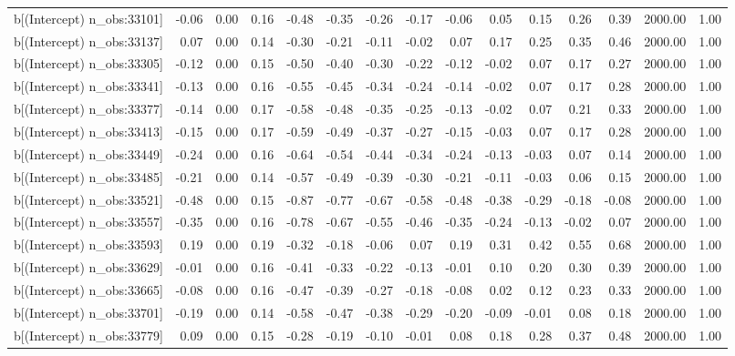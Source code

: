\begin{table}[ht]
\begin{tabular}{rrrrrrrrrrrrrrr}
  b[(Intercept) n\_obs:33101] & -0.06 & 0.00 & 0.16 & -0.48 & -0.35 & -0.26 & -0.17 & -0.06 & 0.05 & 0.15 & 0.26 & 0.39 & 2000.00 & 1.00 \\ 
  b[(Intercept) n\_obs:33137] & 0.07 & 0.00 & 0.14 & -0.30 & -0.21 & -0.11 & -0.02 & 0.07 & 0.17 & 0.25 & 0.35 & 0.46 & 2000.00 & 1.00 \\ 
  b[(Intercept) n\_obs:33305] & -0.12 & 0.00 & 0.15 & -0.50 & -0.40 & -0.30 & -0.22 & -0.12 & -0.02 & 0.07 & 0.17 & 0.27 & 2000.00 & 1.00 \\ 
  b[(Intercept) n\_obs:33341] & -0.13 & 0.00 & 0.16 & -0.55 & -0.45 & -0.34 & -0.24 & -0.14 & -0.02 & 0.07 & 0.17 & 0.28 & 2000.00 & 1.00 \\ 
  b[(Intercept) n\_obs:33377] & -0.14 & 0.00 & 0.17 & -0.58 & -0.48 & -0.35 & -0.25 & -0.13 & -0.02 & 0.07 & 0.21 & 0.33 & 2000.00 & 1.00 \\ 
  b[(Intercept) n\_obs:33413] & -0.15 & 0.00 & 0.17 & -0.59 & -0.49 & -0.37 & -0.27 & -0.15 & -0.03 & 0.07 & 0.17 & 0.28 & 2000.00 & 1.00 \\ 
  b[(Intercept) n\_obs:33449] & -0.24 & 0.00 & 0.16 & -0.64 & -0.54 & -0.44 & -0.34 & -0.24 & -0.13 & -0.03 & 0.07 & 0.14 & 2000.00 & 1.00 \\ 
  b[(Intercept) n\_obs:33485] & -0.21 & 0.00 & 0.14 & -0.57 & -0.49 & -0.39 & -0.30 & -0.21 & -0.11 & -0.03 & 0.06 & 0.15 & 2000.00 & 1.00 \\ 
  b[(Intercept) n\_obs:33521] & -0.48 & 0.00 & 0.15 & -0.87 & -0.77 & -0.67 & -0.58 & -0.48 & -0.38 & -0.29 & -0.18 & -0.08 & 2000.00 & 1.00 \\ 
  b[(Intercept) n\_obs:33557] & -0.35 & 0.00 & 0.16 & -0.78 & -0.67 & -0.55 & -0.46 & -0.35 & -0.24 & -0.13 & -0.02 & 0.07 & 2000.00 & 1.00 \\ 
  b[(Intercept) n\_obs:33593] & 0.19 & 0.00 & 0.19 & -0.32 & -0.18 & -0.06 & 0.07 & 0.19 & 0.31 & 0.42 & 0.55 & 0.68 & 2000.00 & 1.00 \\ 
  b[(Intercept) n\_obs:33629] & -0.01 & 0.00 & 0.16 & -0.41 & -0.33 & -0.22 & -0.13 & -0.01 & 0.10 & 0.20 & 0.30 & 0.39 & 2000.00 & 1.00 \\ 
  b[(Intercept) n\_obs:33665] & -0.08 & 0.00 & 0.16 & -0.47 & -0.39 & -0.27 & -0.18 & -0.08 & 0.02 & 0.12 & 0.23 & 0.33 & 2000.00 & 1.00 \\ 
  b[(Intercept) n\_obs:33701] & -0.19 & 0.00 & 0.14 & -0.58 & -0.47 & -0.38 & -0.29 & -0.20 & -0.09 & -0.01 & 0.08 & 0.18 & 2000.00 & 1.00 \\ 
  b[(Intercept) n\_obs:33779] & 0.09 & 0.00 & 0.15 & -0.28 & -0.19 & -0.10 & -0.01 & 0.08 & 0.18 & 0.28 & 0.37 & 0.48 & 2000.00 & 1.00 \\ 

\end{tabular}
\end{table}

